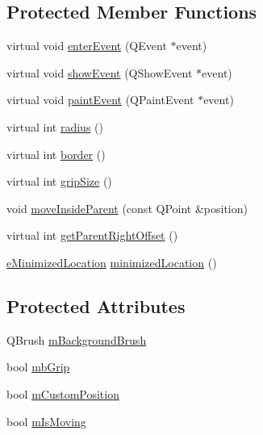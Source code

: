 \subsection*{Protected Member Functions}
\begin{DoxyCompactItemize}
\item 
virtual void \hyperlink{class_u_b_floating_palette_a2d23d85ab504d42ccbd603a8eb5c543c}{enter\-Event} (Q\-Event $\ast$event)
\item 
virtual void \hyperlink{class_u_b_floating_palette_ad1b5652affcca631745df045446974fa}{show\-Event} (Q\-Show\-Event $\ast$event)
\item 
virtual void \hyperlink{class_u_b_floating_palette_a8244a24b5bda64467ad6af028d93fd7b}{paint\-Event} (Q\-Paint\-Event $\ast$event)
\item 
virtual int \hyperlink{class_u_b_floating_palette_a225916e149529d6e39a89faf4e49acdf}{radius} ()
\item 
virtual int \hyperlink{class_u_b_floating_palette_a1902d37271315e9e06d6743752104f47}{border} ()
\item 
virtual int \hyperlink{class_u_b_floating_palette_a268429f78bcf15c11f3c03eed621f93d}{grip\-Size} ()
\item 
void \hyperlink{class_u_b_floating_palette_a187ee35c53cfad79bb5b30dff1800732}{move\-Inside\-Parent} (const Q\-Point \&position)
\item 
virtual int \hyperlink{class_u_b_floating_palette_acf3ead0c3d8a3bde89b934ad208e9f9a}{get\-Parent\-Right\-Offset} ()
\item 
\hyperlink{_u_b_floating_palette_8h_ac8adc001960a33bd6c76686f775bd7eb}{e\-Minimized\-Location} \hyperlink{class_u_b_floating_palette_a45f8ba7b4a88755089596c30b040b1cc}{minimized\-Location} ()
\end{DoxyCompactItemize}
\subsection*{Protected Attributes}
\begin{DoxyCompactItemize}
\item 
Q\-Brush \hyperlink{class_u_b_floating_palette_a9911f9e0bdae7562c1327a955974a8e4}{m\-Background\-Brush}
\item 
bool \hyperlink{class_u_b_floating_palette_a154c8a83dd77e2d02071a46c19976db2}{mb\-Grip}
\item 
bool \hyperlink{class_u_b_floating_palette_a5fb4099a5276d969d5463eb96df94521}{m\-Custom\-Position}
\item 
bool \hyperlink{class_u_b_floating_palette_a657c2c6a41c9a06ca8d7ec9e5e67a7e9}{m\-Is\-Moving}
\end{DoxyCompactItemize}
